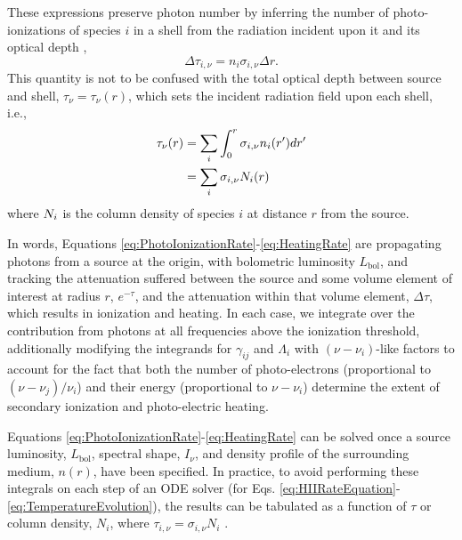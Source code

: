 These expressions preserve photon number by inferring the number of photo-ionizations of species $i$ in a shell from the radiation incident upon it and its optical depth \cite{Abel1999},
\begin{equation}
    \Delta \tau_{i,\nu} = n_i \sigma_{i,\nu} \Delta r .
\end{equation}    
This quantity is not to be confused with the total optical depth between source and shell, $\tau_{\nu} = \tau_{\nu}(r)$, which sets the incident radiation field upon each shell, i.e.,
\begin{align}
    \tau_{\nu}(r) & = \sum_i \int_0^r \sigma_{i,\nu} n_i(r^{\prime}) dr^{\prime} \nonumber \\
                  & = \sum_i \sigma_{i,\nu} N_i(r) \label{eq:OpticalDepth}
\end{align}
where $N_i$ is the column density of species $i$ at distance $r$ from the
source. 

In words, Equations \ref{eq:PhotoIonizationRate}-\ref{eq:HeatingRate} are propagating photons from a source at the origin, with bolometric luminosity $L_{\mathrm{bol}}$, and tracking the attenuation suffered between the source and some volume element of interest at radius $r$, $e^{-\tau}$, and the attenuation within that volume element, $\Delta \tau$, which results in ionization and heating. In each case, we integrate over the contribution from photons at all frequencies above the ionization threshold, additionally modifying the integrands for $\gamma_{ij}$ and $\Lambda_i$ with $(\nu - \nu_i)$-like factors to account for the fact that both the number of photo-electrons (proportional to $(\nu - \nu_j) / \nu_i$) and their energy (proportional to $\nu - \nu_i$) determine the extent of secondary ionization and photo-electric heating. 

Equations \ref{eq:PhotoIonizationRate}-\ref{eq:HeatingRate} can be solved once a source luminosity, $L_{\mathrm{bol}}$, spectral shape, $I_{\nu}$, and density profile of the surrounding medium, $n(r)$, have been specified. In practice, to avoid performing these integrals on each step of an ODE solver (for Eqs. \ref{eq:HIIRateEquation}-\ref{eq:TemperatureEvolution}), the results can be tabulated as a function of $\tau$ or column density, $N_i$, where $\tau_{i,\nu}=\sigma_{i,\nu} N_i$ \cite{Thomas2008,Mirocha2012}.


